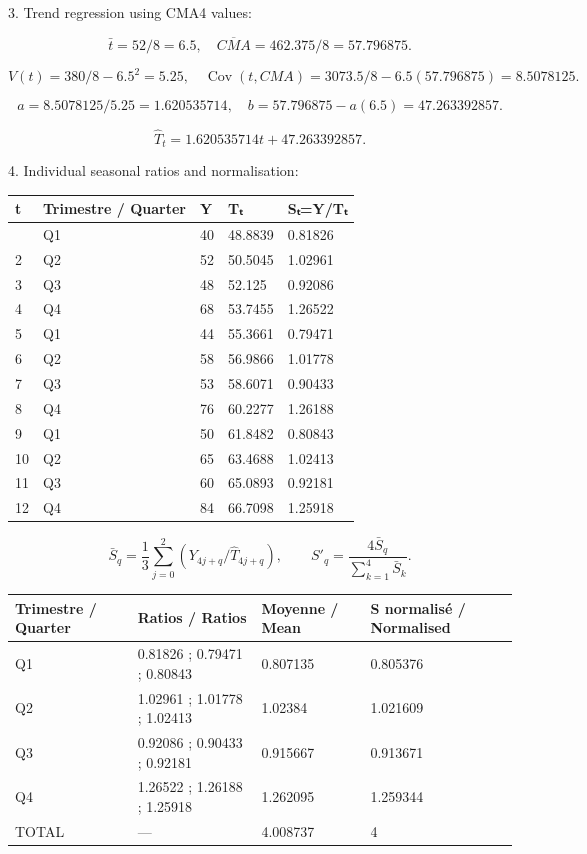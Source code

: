 \documentclass[11pt,a4paper]{article}
\begin{document}
3. Trend regression using CMA4 values:

\[\bar t=52/8=6.5,\quad\overline{CMA}=462.375/8=57.796875.\]

\[V(t)=380/8-6.5^2=5.25,\quad\operatorname{Cov}(t,CMA)=3073.5/8-6.5(57.796875)=8.5078125.\]

\[a=8.5078125/5.25=1.620535714,\quad b=57.796875-a(6.5)=47.263392857.\]

\[\widehat T_t=1.620535714t+47.263392857.\]

4. Individual seasonal ratios and normalisation:

\begin{longtable}[]{@{}lllll@{}}
\toprule\noalign{}
t & Trimestre / Quarter & Y & Tₜ & Sₜ=Y/Tₜ \\
\midrule\noalign{}
\endhead
\bottomrule\noalign{}
\endlastfoot
1 & Q1 & 40 & 48.8839 & 0.81826 \\
2 & Q2 & 52 & 50.5045 & 1.02961 \\
3 & Q3 & 48 & 52.125 & 0.92086 \\
4 & Q4 & 68 & 53.7455 & 1.26522 \\
5 & Q1 & 44 & 55.3661 & 0.79471 \\
6 & Q2 & 58 & 56.9866 & 1.01778 \\
7 & Q3 & 53 & 58.6071 & 0.90433 \\
8 & Q4 & 76 & 60.2277 & 1.26188 \\
9 & Q1 & 50 & 61.8482 & 0.80843 \\
10 & Q2 & 65 & 63.4688 & 1.02413 \\
11 & Q3 & 60 & 65.0893 & 0.92181 \\
12 & Q4 & 84 & 66.7098 & 1.25918 \\
\end{longtable}

\[\bar S_q=\frac{1}{3}\sum_{j=0}^2(Y_{4j+q}/\widehat T_{4j+q}),\qquad S'_q=\frac{4\bar S_q}{\sum_{k=1}^4\bar S_k}.\]

\begin{longtable}[]{@{}llll@{}}
\toprule\noalign{}
Trimestre / Quarter & Ratios / Ratios & Moyenne / Mean & S\textquotesingle{} normalisé / Normalised \\
\midrule\noalign{}
\endhead
\bottomrule\noalign{}
\endlastfoot
Q1 & 0.81826 ; 0.79471 ; 0.80843 & 0.807135 & 0.805376 \\
Q2 & 1.02961 ; 1.01778 ; 1.02413 & 1.02384 & 1.021609 \\
Q3 & 0.92086 ; 0.90433 ; 0.92181 & 0.915667 & 0.913671 \\
Q4 & 1.26522 ; 1.26188 ; 1.25918 & 1.262095 & 1.259344 \\
TOTAL & --- & 4.008737 & 4 \\
\end{longtable}
\end{document}
